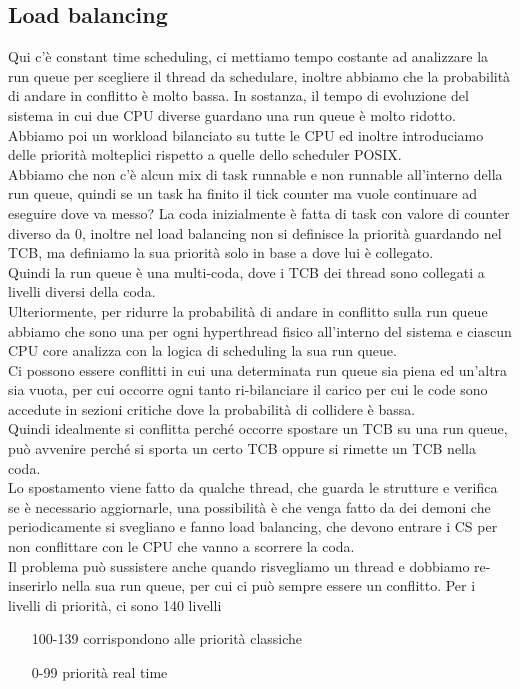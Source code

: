 \documentclass[12pt, oneside]{extbook}
\begin{document}
\subsection{Load balancing}
Qui c'è constant time scheduling, ci mettiamo tempo costante ad analizzare la run queue per scegliere il thread da schedulare, inoltre abbiamo che la probabilità di andare in conflitto è molto bassa. In sostanza, il tempo di evoluzione del sistema in cui due CPU diverse guardano una run queue è molto ridotto. Abbiamo poi un workload bilanciato su tutte le CPU ed inoltre introduciamo delle priorità molteplici rispetto a quelle dello scheduler POSIX.\\Abbiamo che non c'è alcun mix di task runnable e non runnable all'interno della run queue, quindi se un task ha finito il tick counter ma vuole continuare ad eseguire dove va messo? La coda inizialmente è fatta di task con valore di counter diverso da 0, inoltre nel load balancing non si definisce la priorità guardando nel TCB, ma definiamo la sua priorità solo in base a dove lui è collegato.\\Quindi la run queue è una multi-coda, dove i TCB dei thread sono collegati a livelli diversi della coda.\\Ulteriormente, per ridurre la probabilità di andare in conflitto sulla run queue abbiamo che sono una per ogni hyperthread fisico all'interno del sistema e ciascun CPU core analizza con la logica di scheduling la sua run queue.\\Ci possono essere conflitti in cui una determinata run queue sia piena ed un'altra sia vuota, per cui occorre ogni tanto ri-bilanciare il carico per cui le code sono accedute in sezioni critiche dove la probabilità di collidere è bassa.\\Quindi idealmente si conflitta perché occorre spostare un TCB su una run queue, può avvenire perché si sporta un certo TCB oppure si rimette un TCB nella coda.\\Lo spostamento viene fatto da qualche thread, che guarda le strutture e verifica se è necessario aggiornarle, una possibilità è che venga fatto da dei demoni che periodicamente si svegliano e fanno load balancing, che devono entrare i CS per non conflittare con le CPU che vanno a scorrere la coda.\\Il problema può sussistere anche quando risvegliamo un thread e dobbiamo re-inserirlo nella sua run queue, per cui ci può sempre essere un conflitto. Per i livelli di priorità, ci sono 140 livelli
\begin{itemize}
\item [100-139] corrispondono alle priorità classiche
\item [0-99] priorità real time
\end{itemize}
\end{document}

